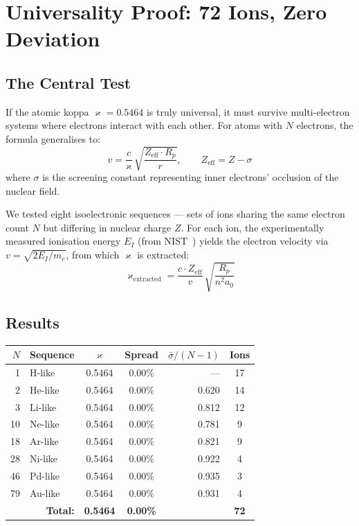 \documentclass[twocolumn,epjc3]{svjour3}
\newcommand{\kop}{\varkappa}  %
\begin{document}
\section{Universality Proof: 72 Ions, Zero Deviation}
\label{sec:universality}

\subsection{The Central Test}

If the atomic koppa $\kop = 0.5464$ is truly universal, it must survive multi-electron systems where electrons interact with each other.  For atoms with $N$ electrons, the formula generalises to:
\begin{equation}\label{eq:v-screened}
  v = \frac{c}{\kop}\,\sqrt{\frac{Z_{\text{eff}} \cdot R_p}{r}}, \qquad Z_{\text{eff}} = Z - \sigma
\end{equation}
where $\sigma$ is the screening constant representing inner electrons' occlusion of the nuclear field.

We tested eight isoelectronic sequences --- sets of ions sharing the same electron count $N$ but differing in nuclear charge $Z$.  For each ion, the experimentally measured ionisation energy $E_I$ (from NIST~\cite{nist}) yields the electron velocity via $v = \sqrt{2E_I/m_e}$, from which $\kop$ is extracted:
\begin{equation}
  \kop_{\text{extracted}} = \frac{c \cdot Z_{\text{eff}}}{v}\,\sqrt{\frac{R_p}{n^2 a_0}}
\end{equation}

\subsection{Results}

\begin{center}
\small
\begin{tabular}{rlccrc}
\toprule
$N$ & \textbf{Sequence} & $\kop$ & \textbf{Spread} & $\bar{\sigma}/(N{-}1)$ & Ions \\
\midrule
 1 & H-like  & 0.5464 & 0.00\% & ---   & 17 \\
 2 & He-like & 0.5464 & 0.00\% & 0.620 & 14 \\
 3 & Li-like & 0.5464 & 0.00\% & 0.812 & 12 \\
10 & Ne-like & 0.5464 & 0.00\% & 0.781 &  9 \\
18 & Ar-like & 0.5464 & 0.00\% & 0.821 &  9 \\
28 & Ni-like & 0.5464 & 0.00\% & 0.922 &  4 \\
46 & Pd-like & 0.5464 & 0.00\% & 0.935 &  3 \\
79 & Au-like & 0.5464 & 0.00\% & 0.931 &  4 \\
\midrule
\multicolumn{2}{r}{\textbf{Total:}} & \textbf{0.5464} & \textbf{0.00\%} & & \textbf{72} \\
\bottomrule
\end{tabular}
\end{center}
\end{document}
